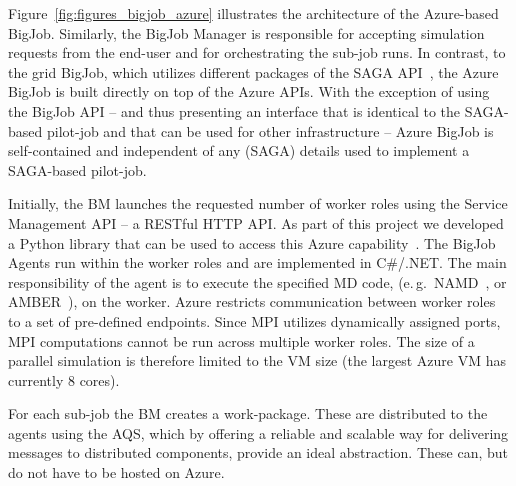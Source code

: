\documentclass[conference,final]{IEEEtran}
\newcommand{\alnote}[1]{ {\textcolor{blue} { ***AL: #1 }}}
\newcommand{\jhanote}[1]{ {\textcolor{red} { ***SJ: #1 }}}
\newcommand{\alnote}[1]{}
\newcommand{\jhanote}[1]{}
\begin{document}
Figure~\ref{fig:figures_bigjob_azure} illustrates the architecture of
the Azure-based BigJob. Similarly, the BigJob Manager is responsible for
accepting simulation requests from the end-user and for orchestrating
the sub-job runs.  In contrast, to the grid BigJob, which utilizes
different packages of the SAGA API~\cite{saga_url}, the Azure BigJob
is built directly on top of the Azure APIs. With the exception of
using the BigJob API -- and thus presenting an interface that is
identical to the SAGA-based pilot-job and that can be used for other
infrastructure --  Azure BigJob is self-contained and independent of any
(SAGA) details used to implement a SAGA-based pilot-job.


Initially, the BM launches the requested number of worker
roles %
using the Service Management API -- a RESTful HTTP API.
As part of this project we developed a Python library that can be used
to access this Azure capability~\cite{azure-service-python}. The
BigJob Agents run within the worker roles and are implemented in
C\#/.NET. The main responsibility of the agent is to execute the
specified MD code, (e.\,g.\ NAMD~\cite{Phillips:2005gd}, or
AMBER~\cite{tec2}), on the worker. Azure restricts communication
between worker roles to a set of pre-defined endpoints.
Since MPI utilizes dynamically assigned ports, MPI computations cannot
be run across multiple worker roles.  The size of a parallel
simulation is therefore limited to the VM size (the largest Azure VM
has currently 8 cores).

For each sub-job the BM creates a work-package. These are distributed
to the agents using the AQS, which by offering a reliable and scalable
way for delivering messages to distributed components, provide an
ideal abstraction. These can, but do not have to be hosted on Azure.



\end{document}
